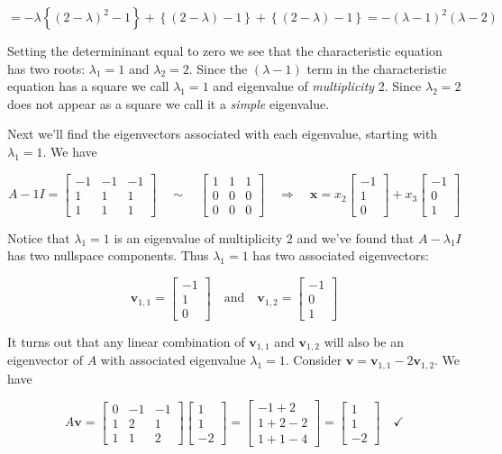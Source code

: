 \documentclass[12pt]{article}
\newcommand{\nin}{\noindent}
\newcommand{\vthree}{\vspace{3mm}}
\newcommand{\myp}[1]{\left( #1 \right)}
\newcommand{\mys}[1]{\left\{ #1 \right\}}
\newcommand{\mymat}[1]{
\left[
\begin{array}{rrrrrrrrrrrrrrrrrrrrrrrrrrrrrrrrrrrrrrr}
#1
\end{array}
\right]
}
\newcommand{\bx}{\mathbf{x}}
\newcommand{\bv}{\mathbf{v}}
\begin{document}
\[
= -\lambda\mys{\myp{2-\lambda}^2 - 1} + \mys{\myp{2-\lambda}-1}+ \mys{\myp{2-\lambda}-1}
= -\myp{\lambda -1}^2\myp{\lambda -2}
\]

\vthree

\nin Setting the determininant equal to zero we see that the characteristic equation has two roots: $\lambda_1 = 1$ and $\lambda_2 = 2$.  Since the $\myp{\lambda -1}$ term in the characteristic equation has a square we call $\lambda_1 = 1$ and eigenvalue of {\it multiplicity} 2.  Since $\lambda_2 = 2$ does not appear as a square we call it a {\it simple} eigenvalue.

\vthree

\nin Next we'll find the eigenvectors associated with each eigenvalue, starting with $\lambda_1 = 1$.  We have

\[
A - 1I =
\mymat{
-1 & -1 & -1 \\
1 & 1 & 1 \\
1 & 1 & 1
}
\quad \sim \quad
\mymat{
1 & 1 & 1 \\
0 & 0 & 0 \\
0 & 0 & 0
}
\quad \Rightarrow \quad
\bx =
x_2 \mymat{-1 \\ 1 \\ 0} + x_3\mymat{-1 \\ 0 \\ 1}
\]

\vthree

\nin Notice that $\lambda_1 = 1$ is an eigenvalue of multiplicity 2 and we've found that $A - \lambda_1 I$ has two nullspace components.  Thus $\lambda_1 = 1$ has two associated eigenvectors:

\[
\bv_{1,1} = \mymat{-1 \\ 1 \\ 0} \quad \textrm{and} \quad \bv_{1,2} = \mymat{-1 \\ 0 \\ 1}
\]

\clearpage

\nin It turns out that any linear combination of $\bv_{1,1}$ and $\bv_{1,2}$ will also be an eigenvector of $A$ with associated eigenvalue $\lambda_1 = 1$.  Consider $\bv = \bv_{1,1} - 2\bv_{1,2}$.  We have

\[
A\bv =
\mymat{
0 & -1 & -1 \\
1 & 2 & 1 \\
1 & 1 & 2
}
\mymat{
1 \\
1 \\
-2
}
=
\mymat{
-1 + 2 \\
1 + 2 - 2 \\
1 + 1 - 4
}
=
\mymat{
1 \\
1 \\
-2
} \quad \checkmark
\]
\end{document}

